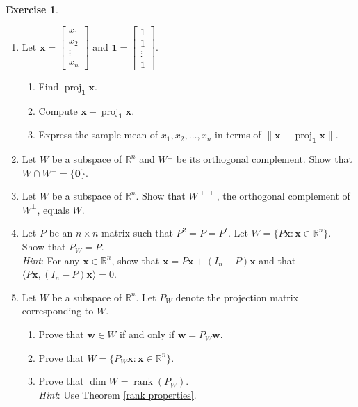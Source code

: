 \documentclass[12pt,letterpaper]{book}
\numberwithin{equation}{section}
\theoremstyle{definition}
\newtheorem{exercise}{\textbf{Exercise}}[chapter]
\newcommand{\vw}{\bm{w}}
\newcommand{\vx}{\bm{x}}
\newcommand{\veczero}{\bm{0}}
\newcommand{\rank}{\operatorname{rank}}
\begin{document}
\begin{exercise} \quad \label{ortho exer}
\begin{enumerate}[\bfseries 1.]
\item Let $\vx=\left[\begin{array}{c} x_1 \\ x_2 \\ \vdots \\ x_n \end{array}\right]$ and $\bm{1}=\left[\begin{array}{c} 1 \\ 1 \\ \vdots \\ 1 \end{array}\right]$.
\begin{enumerate}
\item Find $\operatorname{proj}_{\bm{1}}\vx$. 
\item Compute $\vx-\operatorname{proj}_{\bm{1}}\vx$.
\item Express the sample mean of $x_1,x_2,\ldots,x_n$ in terms of $\|\vx-\operatorname{proj}_{\bm{1}}\vx\|$.
\end{enumerate}

\item Let $W$ be a subspace of $\mathbb{R}^n$ and $W^\perp$ be its orthogonal complement. Show that $W\cap W^\perp=\{\veczero\}$.

\item Let $W$ be a subspace of $\mathbb{R}^n$. Show that $W^{\perp\perp}$, the orthogonal complement of $W^{\perp}$, equals $W$.

\item\label{ptp2p} Let $P$ be an $n\times n$ matrix such that $P^2=P=P^t$. Let $W=\{P\vx:\vx\in \mathbb{R}^n\}$. Show that $P_W=P$.\\
\textit{Hint}: For any $\vx\in \mathbb{R}^n$, show that $\vx=P\vx+(I_n-P)\vx$ and that $\langle P\vx, (I_n-P)\vx\rangle=0$.

\item\label{w=Pw} Let $W$ be a subspace of $\mathbb{R}^n$. Let $P_W$ denote the projection matrix corresponding to $W$.
\begin{enumerate}
\item Prove that $\vw\in W$ if and only if $\vw=P_W\vw$.
\item Prove that $W=\{P_W\vx:\vx \in \mathbb{R}^n\}$.
\item Prove that $\dim W=\rank (P_W)$.\\
\textit{Hint}: Use Theorem \ref{rank properties}.
\end{enumerate}


\end{enumerate}
\end{exercise}
\end{document}
